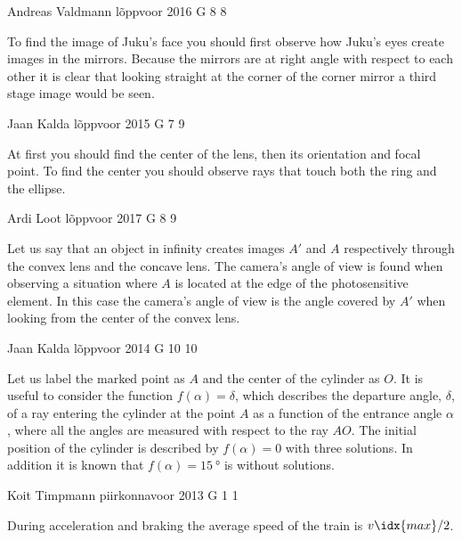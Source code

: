 \documentclass[11pt]{article}
\begin{document}
{Andreas Valdmann} %
{lõppvoor} %
{2016} %
{G 8} %
{8} %
{

\ifEngHint
To find the image of Juku’s face you should first observe how Juku’s eyes create images in the mirrors. Because the mirrors are at right angle with respect to each other it is clear that looking straight at the corner of the corner mirror a third stage image would be seen.
\fi
}

{Jaan Kalda} %
{lõppvoor} %
{2015} %
{G 7} %
{9} %
{

\ifEngHint
At first you should find the center of the lens, then its orientation and focal point. To find the center you should observe rays that touch both the ring and the ellipse.
\fi
}

{Ardi Loot} %
{lõppvoor} %
{2017} %
{G 8} %
{9} %
{

\ifEngHint
Let us say that an object in infinity creates images $A'$ and $A$ respectively through the convex lens and the concave lens. The camera’s angle of view is found when observing a situation where $A$ is located at the edge of the photosensitive element. In this case the camera’s angle of view is the angle covered by $A'$ when looking from the center of the convex lens.
\fi
}

{Jaan Kalda} %
{lõppvoor} %
{2014} %
{G 10} %
{10} %
{

\ifEngHint
Let us label the marked point as $A$ and the center of the cylinder as $O$. It is useful to consider the function $f(\alpha) = \delta$, which describes the departure angle, $\delta$, of a ray entering the cylinder at the point $A$ as a function of the entrance angle $\alpha$, where all the angles are measured with respect to the ray $AO$. The initial position of the cylinder is described by $f(\alpha) = 0$ with three solutions. In addition it is known that $f(\alpha) = \SI{15}{\degree}$ is without solutions.
\fi
}

{Koit Timpmann} %
{piirkonnavoor} %
{2013} %
{G 1} %
{1} %
{

\ifEngHint
During acceleration and braking the average speed of the train is $v\idx{max}/2$.
\fi
}
\end{document}
